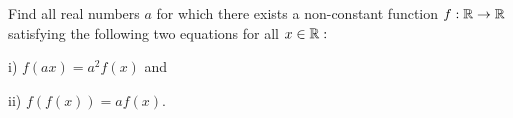 Find all real numbers $a$ for which there exists a non-constant function $f :\Bbb R \to \Bbb R$ satisfying the following two equations for all $x\in \Bbb R:$

i) $f(ax) = a^2f(x)$ and

ii) $f(f(x)) = a f(x).$